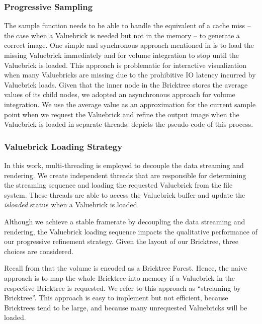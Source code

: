 \subsubsection{Progressive Sampling}
The sample function needs to be able to handle the equivalent of a cache miss -- the case
when a Valuebrick is needed but not in the memory -- to generate a correct image.
One simple and synchronous approach mentioned in \cite{crassin2009gigavoxels} is to
load the missing Valuebrick immediately and for volume integration to stop until 
the Valuebrick is loaded. 
This approach is problematic for interactive visualization when many Valuebricks are missing 
due to the prohibitive IO latency incurred by Valuebrick loads. Given that the inner node
in the Bricktree stores the average values of its child nodes, we adopted an
asynchronous approach for volume integration. We use the average value as an
approximation for the current sample point when we request the Valuebrick and
refine the output image when the Valuebrick is loaded in separate threads. 
 depicts the pseudo-code of this process. 



\subsubsection{Valuebrick Loading Strategy}
In this work, multi-threading is employed to decouple the data streaming and rendering. 
We create independent threads that are responsible for determining the streaming sequence
and loading the requested Valuebrick from the file system. These threads are able to access
the Valuebrick buffer and update the \textit{isloaded} status when a Valuebrick is loaded. 

Although we achieve a stable framerate by decoupling the data streaming and rendering, the 
Valuebrick loading sequence impacts the qualitative performance of our 
progressive refinement strategy. Given the layout of our Bricktree, three choices are considered.


Recall from  that the volume is encoded as a Bricktree Forest. 
Hence, the naive approach is to map the whole Bricktree into memory if a Valuebrick in the
respective Bricktree is requested. We refer to this approach as ``streaming by Bricktree''. 
This approach is easy to implement but not efficient, because Bricktrees tend to be large, 
and because many unrequested Valuebricks will be loaded. 



